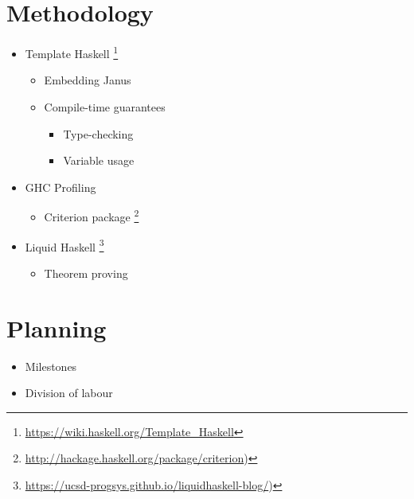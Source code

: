\documentclass[12pt,a4paper]{article}
\begin{document}
\section{Methodology}
\begin{itemize}
	\item{Template Haskell \footnote{\url{https://wiki.haskell.org/Template_Haskell}}}
	\begin{itemize}
		\item{Embedding Janus}
		\item{Compile-time guarantees}
		\begin{itemize}
			\item{Type-checking}
			\item{Variable usage}
		\end{itemize}
		
	\end{itemize}
	
	\item{GHC Profiling}
	\begin{itemize}
		\item{Criterion package \footnote{\url{http://hackage.haskell.org/package/criterion})}}
	\end{itemize}
	
	\item{Liquid Haskell \footnote{\url{https://ucsd-progsys.github.io/liquidhaskell-blog/})}}
	\begin{itemize}
		\item{Theorem proving}
	\end{itemize}
\end{itemize}

\section{Planning}
\begin{itemize}
	\item{Milestones}
	\item{Division of labour}
\end{itemize}
\end{document}
